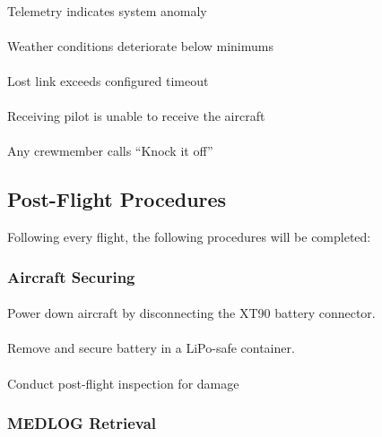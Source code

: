             \paragraph{} Telemetry indicates system anomaly
            \paragraph{} Weather conditions deteriorate below minimums
            \paragraph{} Lost link exceeds configured timeout
            \paragraph{} Receiving pilot is unable to receive the aircraft
            \paragraph{} Any crewmember calls ``Knock it off''

    \subsection{Post-Flight Procedures}\label{ssec:postflight} Following every flight, the following procedures will be completed: 

        \subsubsection{Aircraft Securing}
            \paragraph{} Power down aircraft by disconnecting the XT90 battery connector.
            \paragraph{} Remove and secure battery in a LiPo-safe container.
            \paragraph{} Conduct post-flight inspection for damage

        \subsubsection{MEDLOG Retrieval}
